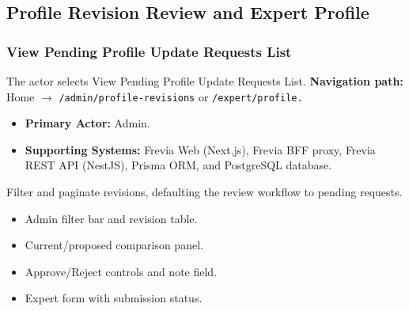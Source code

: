

\subsection{Profile Revision Review and Expert Profile}

\subsubsection{View Pending Profile Update Requests List}

The actor selects View Pending Profile Update Requests List.\newline
\textbf{Navigation path:} Home $\rightarrow$ \texttt{/\allowbreak{}admin/\allowbreak{}profile-\allowbreak{}revisions} or \texttt{/\allowbreak{}expert/\allowbreak{}profile.}


\begin{itemize}[leftmargin=1.6em,topsep=3pt,itemsep=2pt,parsep=0pt,label=$\bullet$]
    \item \textbf{Primary Actor:} Admin.
    \item \textbf{Supporting Systems:} Frevia Web (Next.js), Frevia BFF proxy, Frevia REST API (NestJS), Prisma ORM, and PostgreSQL database.
\end{itemize}

\noindent Filter and paginate revisions, defaulting the review workflow to pending requests.

\begin{itemize}[leftmargin=1.6em,topsep=3pt,itemsep=2pt,parsep=0pt,label=$\bullet$]
    \item Admin filter bar and revision table.
    \item Current/proposed comparison panel.
    \item Approve/Reject controls and note field.
    \item Expert form with submission status.
\end{itemize}

